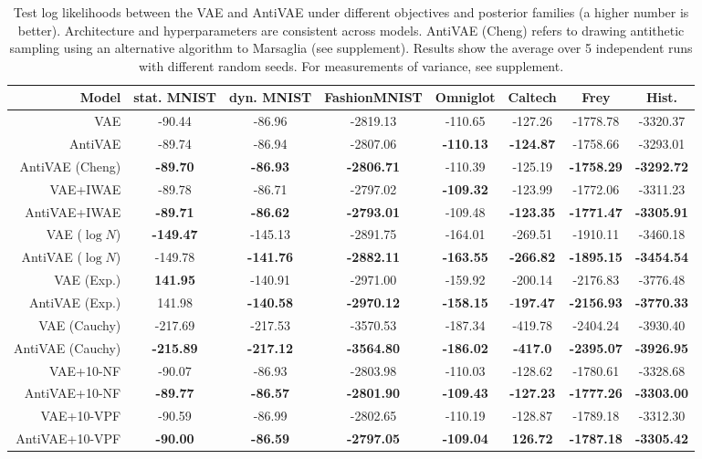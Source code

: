 \begin{table*}[t!]
\scriptsize
\begin{tabular}{r|ccccccc}
    Model & stat. MNIST & dyn. MNIST & FashionMNIST & Omniglot & Caltech  & Frey & Hist. \\
    \toprule
    VAE & -90.44 & -86.96 & -2819.13 & -110.65 & -127.26 & -1778.78 & -3320.37\\
    AntiVAE & -89.74 & -86.94 & -2807.06 & \textbf{-110.13} & \textbf{-124.87} & -1758.66 & -3293.01 \\
    AntiVAE (Cheng) & \textbf{-89.70} & \textbf{-86.93} & \textbf{-2806.71} & -110.39 &  -125.19 & \textbf{-1758.29} & \textbf{-3292.72}\\
    \hline
    VAE+IWAE & -89.78 & -86.71 & -2797.02 & \textbf{-109.32} & -123.99 & -1772.06 & -3311.23 \\
    AntiVAE+IWAE & \textbf{-89.71} & \textbf{-86.62} & \textbf{-2793.01} & -109.48 & \textbf{-123.35} & \textbf{-1771.47} & \textbf{-3305.91}\\
    \hline
    VAE ($\log N$) & \textbf{-149.47} & -145.13 & -2891.75 & -164.01 & -269.51 & -1910.11 &  -3460.18 \\
    AntiVAE ($\log N$) & -149.78 & \textbf{-141.76} & \textbf{-2882.11} & \textbf{-163.55} & \textbf{-266.82} & \textbf{-1895.15} & \textbf{-3454.54} \\
    \hline
    VAE (Exp.) & \textbf{141.95} & -140.91 & -2971.00 & -159.92 & -200.14 & -2176.83 & -3776.48 \\
    AntiVAE (Exp.) & 141.98 & \textbf{-140.58} & \textbf{-2970.12} & \textbf{-158.15} & -\textbf{197.47} & \textbf{-2156.93} & \textbf{-3770.33} \\
    \hline
    VAE (Cauchy) & -217.69 & -217.53 & -3570.53 & -187.34 & -419.78 & -2404.24 & -3930.40 \\
    AntiVAE (Cauchy) & \textbf{-215.89} & \textbf{-217.12} & \textbf{-3564.80} & \textbf{-186.02} & \textbf{-417.0} & \textbf{-2395.07} & \textbf{-3926.95} \\
    \hline
    VAE+10-NF & -90.07 & -86.93 & -2803.98 & -110.03 & -128.62 & -1780.61 & -3328.68 \\
    AntiVAE+10-NF & \textbf{-89.77} & \textbf{-86.57} & \textbf{-2801.90} & \textbf{-109.43} & \textbf{-127.23} & \textbf{-1777.26} & \textbf{-3303.00}\\
    \hline
    VAE+10-VPF & -90.59 & -86.99 & -2802.65 & -110.19 & -128.87& -1789.18 & -3312.30 \\
    AntiVAE+10-VPF & \textbf{-90.00} & \textbf{-86.59} & \textbf{-2797.05} & \textbf{-109.04} & \textbf{126.72} & \textbf{-1787.18} & \textbf{-3305.42}\\
\end{tabular}
\caption{Test log likelihoods between the VAE and AntiVAE under different objectives and posterior families (a higher number is better). Architecture and hyperparameters are consistent across models. AntiVAE (Cheng) refers to drawing antithetic sampling using an alternative algorithm to Marsaglia (see supplement). Results show the average over 5 independent runs with different random seeds. For measurements of variance, see supplement.}
\label{table:results}
\end{table*}

